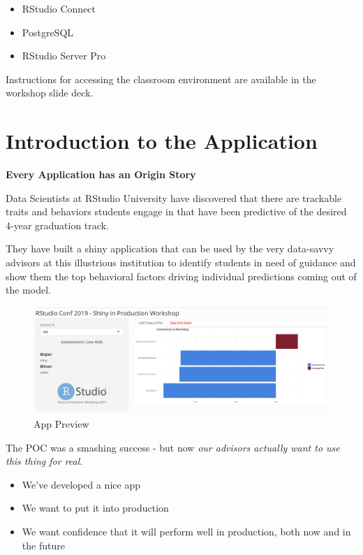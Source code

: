 \documentclass[]{book}
\providecommand{\tightlist}{%
  \setlength{\itemsep}{0pt}\setlength{\parskip}{0pt}}
\theoremstyle{definition}
\theoremstyle{definition}
\theoremstyle{definition}
\theoremstyle{remark}
\begin{document}
\begin{itemize}
\tightlist
\item
  RStudio Connect
\item
  PostgreSQL
\item
  RStudio Server Pro
\end{itemize}

Instructions for accessing the classroom environment are available in
the workshop slide deck.

\hypertarget{app-intro}{%
\chapter{Introduction to the Application}\label{app-intro}}

\textbf{Every Application has an Origin Story}

Data Scientists at RStudio University have discovered that there are
trackable traits and behaviors students engage in that have been
predictive of the desired 4-year graduation track.

They have built a shiny application that can be used by the very
data-savvy advisors at this illustrious institution to identify students
in need of guidance and show them the top behavioral factors driving
individual predictions coming out of the model.

\begin{figure}
\centering
\includegraphics{imgs/app-intro/app-screenshot.png}
\caption{App Preview}
\end{figure}

The POC was a smashing success - but now \emph{our advisors actually
want to use this thing for real}.

\begin{itemize}
\tightlist
\item
  We've developed a nice app
\item
  We want to put it into production
\item
  We want confidence that it will perform well in production, both now
  and in the future
\end{itemize}
\end{document}

